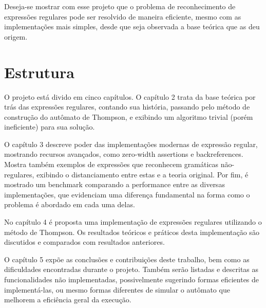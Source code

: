 \documentclass[a4paper,12pt,oneside,onecolumn]{uerj}
\begin{document}
Deseja-se mostrar com esse projeto que o problema de reconhecimento de expressões regulares pode ser resolvido de maneira eficiente, mesmo com as implementações mais simples, desde que seja observada a base teórica que as deu origem.

\section{Estrutura}

O projeto está divido em cinco capítulos. O capítulo 2 trata da base teórica por trás das expressões regulares, contando sua história, passando pelo método de construção do autômato de Thompson, e exibindo um algoritmo trivial (porém ineficiente) para sua solução.

O capítulo 3 descreve poder das implementações modernas de expressão regular, mostrando recursos avançados, como zero-width assertions e backreferences. Mostra também exemplos de expressões que reconhecem gramáticas não-regulares, exibindo o distanciamento entre estas e a teoria original. Por fim, é mostrado um benchmark comparando a performance entre as diversas implementações, que evidenciam uma diferença fundamental na forma como o problema é abordado em cada uma delas.

No capítulo 4 é proposta uma implementação de expressões regulares utilizando o método de Thompson. Os resultados teóricos e práticos desta implementação são discutidos e comparados com resultados anteriores.

O capítulo 5 expõe as conclusões e contribuições deste trabalho, bem como as dificuldades encontradas durante o projeto. Também serão listadas e descritas as funcionalidades não implementadas, possivelmente sugerindo formas eficientes de implementá-las, ou mesmo formas diferentes de simular o autômato que melhorem a eficiência geral da execução.


\backmatter

\end{document}
